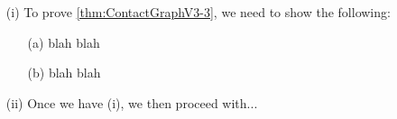 \begin{pf}
\begin{itemize}
\item[(i)]  To prove \ref{thm:ContactGraphV3-3}, we need to show the following:
	\begin{itemize}
	\item[(a)] blah blah
	\item[(b)] blah blah
\end{itemize}
\item[(ii)] Once we have (i), we then proceed with...
\end{itemize}
\end{pf}






